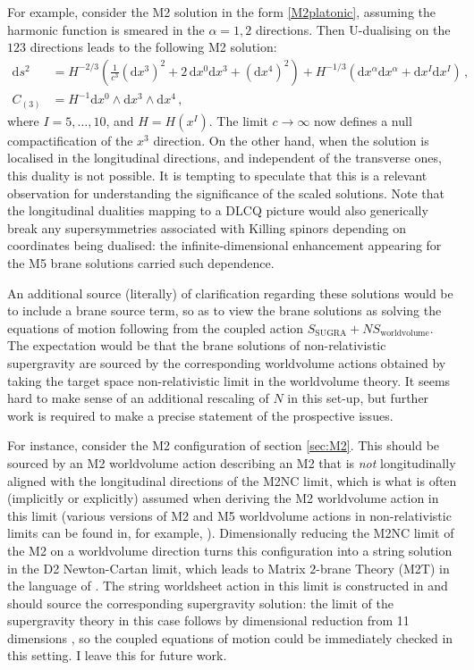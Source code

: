\documentclass[11pt]{article}
\newcommand{\be}{\begin{equation}}
\newcommand{\ee}{\end{equation}}
\newcommand{\dd}{\mathrm{d}}
\numberwithin{equation}{section}
\begin{document}
{{For example, consider the M2 solution in the form \eqref{M2platonic}, assuming the harmonic function is smeared in the $\alpha=1,2$ directions. 
Then U-dualising on the $123$ directions leads to the following M2 solution:
\be
\begin{split}
\dd s^2 & = H^{-2/3} ( \tfrac{1}{c^3} (\dd x^3)^2 + 2 \,\dd x^0 \dd x^3 + (\dd x^4)^2 ) + H^{-1/3} ( \dd x^\alpha \dd x^\alpha + \dd x^I \dd x^I ) \,,\\[4pt]
C_{(3)} & = H^{-1} \dd x^0 \wedge \dd x^3 \wedge \dd x^4 \,,
\end{split}
\ee 
where $I=5,\dots,10$, and $H=H(x^I)$. The limit $c \rightarrow \infty$ now defines a null compactification of the $x^3$ direction.
On the other hand, when the solution is localised in the longitudinal directions, and independent of the transverse ones, this duality is not possible. 
It is tempting to speculate that this is a relevant observation for understanding the significance of the scaled solutions.
Note that the longitudinal dualities mapping to a DLCQ picture would also generically break any supersymmetries associated with Killing spinors depending on coordinates being dualised: the infinite-dimensional enhancement appearing for the M5 brane solutions carried such dependence.


An additional source (literally) of clarification regarding these solutions would be to include a brane source term, so as to view the brane solutions as solving the equations of motion following from the coupled action $S_{\text{SUGRA}} + N S_{\text{worldvolume}}$. 
The expectation would be that the brane solutions of non-relativistic supergravity are sourced by the corresponding worldvolume actions obtained by taking the target space non-relativistic limit in the worldvolume theory.
It seems hard to make sense of an additional rescaling of $N$ in this set-up, but further work is required to make a precise statement of the prospective issues.

For instance, consider the M2 configuration of section \ref{sec:M2}.
This should be sourced by an M2 worldvolume action describing an M2 that is \emph{not} longitudinally aligned with the longitudinal directions of the M2NC limit, which is what is often (implicitly or explicitly) assumed when deriving the M2 worldvolume action in this limit (various versions of M2 and M5 worldvolume actions in non-relativistic limits can be found in, for example, \cite{Garcia:2002fa,Kluson:2019uza,Ebert:2021mfu,Ebert:2023hba}).
Dimensionally reducing the M2NC limit of the M2 on a worldvolume direction turns this configuration into a string solution in the D2 Newton-Cartan limit, which leads to Matrix $2$-brane Theory (M2T) in the language of \cite{Gomis:2023eav, Blair:2023noj, Blair:2024aqz}. The string worldsheet action in this limit is constructed in \cite{Gomis:2023eav} and should source the corresponding supergravity solution: the limit of the supergravity theory in this case follows by dimensional reduction from 11 dimensions \cite{Blair:2021waq}, so the coupled equations of motion could be immediately checked in this setting. I leave this for future work.

}}
\end{document}
